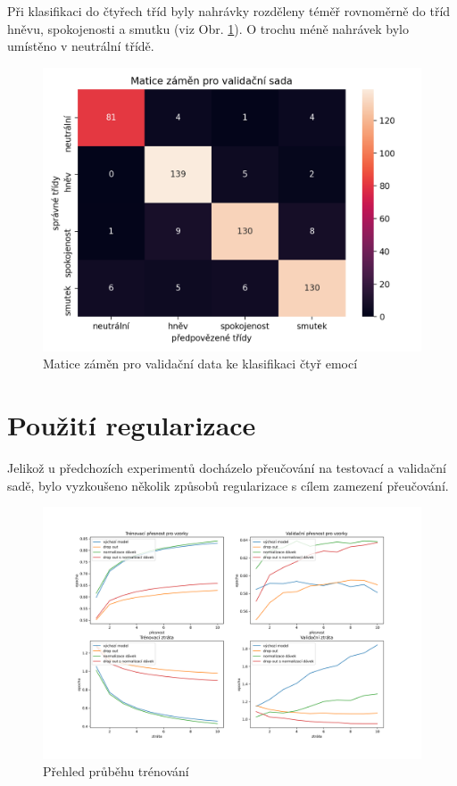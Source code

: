 \documentclass[FM,BP]{tulthesis}
\begin{document}
Při klasifikaci do čtyřech tříd byly nahrávky rozděleny téměř rovnoměrně do tříd hněvu, spokojenosti a smutku (viz Obr. \ref{fig:4_emotions-conf_matrix-val}). O trochu méně nahrávek bylo umístěno v neutrální třídě.

\begin{figure}[!htbp]
\centerline{\includegraphics[scale=.5]{4_emotions-conf_matrix-val.png}}
\caption{Matice záměn pro validační data ke klasifikaci čtyř emocí}
\label{fig:4_emotions-conf_matrix-val}
\end{figure}
\FloatBarrier

\section{Použití regularizace} %
Jelikož u předchozích experimentů docházelo přeučování na testovací a validační sadě, bylo vyzkoušeno několik způsobů regularizace s cílem zamezení přeučování.

\begin{figure}[!htbp]
\centerline{\includegraphics[scale=.5]{training_course-regularization.png}}
\caption{Přehled průběhu trénování}
\label{fig}
\end{figure}
\FloatBarrier
\end{document}
